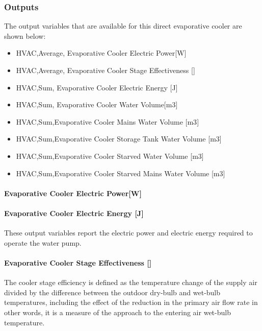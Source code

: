 \subsubsection{Outputs}\label{outputs-1-009}

The output variables that are available for this direct evaporative cooler are shown below:

\begin{itemize}
\item
  HVAC,Average, Evaporative Cooler Electric Power{[}W{]}
\item
  HVAC,Average, Evaporative Cooler Stage Effectiveness {[]}
\item
  HVAC,Sum, Evaporative Cooler Electric Energy {[}J{]}
\item
  HVAC,Sum, Evaporative Cooler Water Volume{[}m3{]}
\item
  HVAC,Sum,Evaporative Cooler Mains Water Volume {[}m3{]}
\item
  HVAC,Sum,Evaporative Cooler Storage Tank Water Volume {[}m3{]}
\item
  HVAC,Sum,Evaporative Cooler Starved Water Volume {[}m3{]}
\item
  HVAC,Sum,Evaporative Cooler Starved Mains Water Volume {[}m3{]}
\end{itemize}

\paragraph{Evaporative Cooler Electric Power{[}W{]}}\label{evaporative-cooler-electric-powerw-1}

\paragraph{Evaporative Cooler Electric Energy {[}J{]}}\label{evaporative-cooler-electric-energy-j-1}

These output variables report the electric power and electric energy required to operate the water pump.

\paragraph{Evaporative Cooler Stage Effectiveness {[]}}\label{evaporative-cooler-stage-effectiveness}

The cooler stage efficiency is defined as the temperature change of the supply air divided by the difference between the outdoor dry-bulb and wet-bulb temperatures, including the effect of the reduction in the primary air flow rate in other words, it is a measure of the approach to the entering air wet-bulb temperature.

